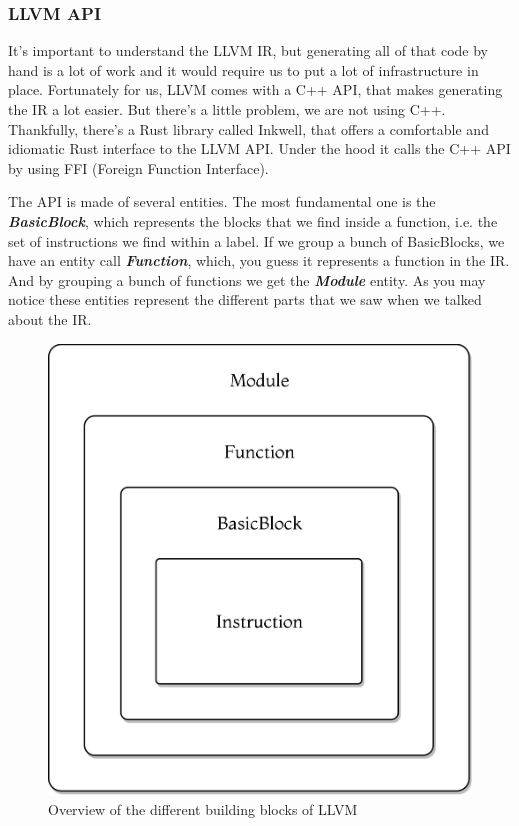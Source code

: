 ﻿\documentclass[10pt,a4paper,twocolumn,twoside]{article}
\begin{document}
\subsubsection{LLVM API}

It's important to understand the LLVM IR, but generating all of that code by
hand is a lot of work and it would require us to put a lot of infrastructure in
place. Fortunately for us, LLVM comes with a C++ API, that makes generating the
IR a lot easier. But there's a little problem, we are not using C++. Thankfully,
there's a Rust library called Inkwell\cite{inkwell}, that offers a comfortable
and idiomatic Rust interface to the LLVM API. Under the hood it calls the C++
API by using FFI (Foreign Function Interface).

The API is made of several entities. The most fundamental one is the
\textbf{\textit{BasicBlock}}, which represents the blocks that we find inside a
function, i.e. the set of instructions we find within a label. If we group a
bunch of BasicBlocks, we have an entity call \textbf{\textit{Function}}, which,
you guess it represents a function in the IR. And by grouping a bunch of
functions we get the \textbf{\textit{Module}} entity. As you may notice these
entities represent the different parts that we saw when we talked about the IR.

\begin{figure}[ht]
\centering
\captionsetup{justification=centering,margin=1cm}
\includegraphics[width=0.75\linewidth]{llvm-blocks}
\caption{Overview of the different building blocks of LLVM}
\end{figure}
\end{document}
